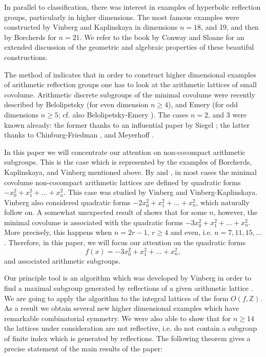\documentclass[smallcondensed]{svjour3}                     %
\begin{document}
In parallel to classification, there was interest in examples of hyperbolic reflection groups, particularly in higher dimensions. The most famous examples were constructed by Vinberg and Kaplinskaya \cite{vinbergkaplinskaja78} in dimensions $n = 18$, and 19, and then by Borcherds \cite{borcherds87} for $n = 21$. We refer to the book by Conway and Sloane \cite{conwaysloane99} for an extended discussion of the geometric and algebraic properties of these beautiful constructions.

The method of \cite{agolbelolipetskystormwhyte08} indicates that in order to construct higher dimensional examples of arithmetic reflection groups one has to look at the arithmetic lattices of small covolume. Arithmetic discrete subgroups of the minimal covolume were recently described by Belolipetsky \cite{belolipetsky04} (for even dimension $n \ge 4$), and Emery \cite{emery09} (for odd dimensions $n \ge 5$; cf. also Belolipetsky-Emery \cite{belolipetskyemery10}). The cases $n=2$, and 3 were known already: the former thanks to an influential paper by Siegel \cite{siegel45}; the latter thanks to Chinburg-Friedman \cite{chinburgfriedman00}, and Meyerhoff \cite{meyerhoff85}. 

In this paper we will concentrate our attention on non-cocompact arithmetic subgroups. This is the case which is represented by the examples of Borcherds, Kaplinskaya, and Vinberg mentioned above. By \cite{belolipetsky04} and \cite{belolipetskyemery10}, in most cases the minimal covolume non-cocompact arithmetic lattices are defined by quadratic forms $-x_0^2 + x_1^2 + \ldots + x_n^2$. This case was studied by Vinberg and Vinberg-Kaplinskaya. Vinberg also considered quadratic forms $-2x_0^2 + x_1^2 + \ldots + x_n^2$, which naturally follow on. A somewhat unexpected result of \cite{belolipetskyemery10} shows that for some $n$, however, the minimal covolume is associated with the quadratic forms $-3x_0^2 + x_1^2 + \ldots + x_n^2$. More precisely, this happens when $n = 2r - 1$, $r \ge 4$ and even, i.e. $n = 7, 11, 15, \ldots$. Therefore, in this paper, we will focus our attention on the quadratic forms 
\[f(x) = -3x_0^2 + x_1^2 + \ldots + x_n^2,\]
and associated arithmetic subgroups.

Our principle tool is an algorithm which was developed by Vinberg in order to find a maximal subgroup generated by reflections of a given arithmetic lattice \cite{vinberg72(2)}. We are going to apply the algorithm to the integral lattices of the form $O(f, \mathbb{Z})$. As a result we obtain several new higher dimensional examples which have remarkable combinatorial symmetry. We were also able to show that for $n \ge 14$ the lattices under consideration are not reflective, i.e. do not contain a subgroup of finite index which is generated by reflections. The following theorem gives a precise statement of the main results of the paper:
\end{document}
